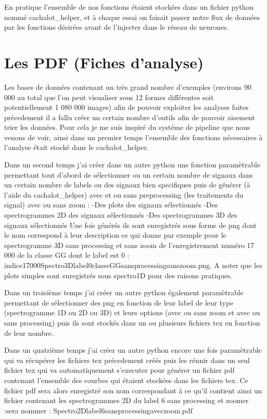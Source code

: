 En pratique l'ensemble de nos fonctions étaient stockées dans un fichier python nommé cachalot_helper, et à chaque essai on faisait passer notre flux de données par les fonctions désirées avant de l'injecter dans le réseau de neurones.


\hypertarget{Les-PDF}{%
\section{Les PDF (Fiches d'analyse)}
\label{Les-PDF}}

Les bases de données contenant un très grand nombre d'exemples (environs 90 000 au total que l'on peut visualiser sous 12 formes différentes soit potentiellement 1 080 000 images) afin de pouvoir exploiter les analyses faites précedement il a fallu créer un certain nombre d'outils afin de pouvoir aisement trier les données.
Pour cela je me suis inspiré du systéme de pipeline que nous venons de voir, ainsi dans un premier temps l'ensemble des fonctions nécessaires à l'analyse était stocké dans le cachalot_helper.

Dans un second temps j'ai créer dans un autre python une fonction paramètrable permettant tout d'abord de sélectionner ou un certain nombre de signaux dans un certain nombre de labels ou des signaux bien specifiques puis de générer (à l'aide du cachalot_helper) avec et ou sans preprocessing (les traitements du signal) avec ou sans zoom :
-Des plots des signaux sélectionnés
-Des spectrogrammes 2D des signaux sélectionnés
-Des spectrogrammes 3D des signaux sélectionnés
Une fois générés ils sont enregistrés sous forme de png dont le nom correspond à leur description ce qui donne par exemple pour le spectrogramme 3D sans processing et sans zoom de l'enregistrement numéro 17 000 de la classe GG dont le label est 0 :
indice17000Spectro3Dlabel0classeGGsansprocessingsanszoom.png. A noter que les plots simples sont enregistrés sous spectro1D pour des raisons pratiques.

Dans un troisième temps j'ai créer un autre python également paramètrable permettant de sélectionner des png en fonction de leur label de leur type (spectrogramme 1D ou 2D ou 3D) et leurs options (avec ou sans zoom et avec ou sans processing) puis ils sont stockés dans un ou plusieurs fichiers tex en fonction de leur nombre.

Dans un quatrième temps j'ai créer un autre python encore une fois paramètrable qui va récupérer les fichiers tex précedement créés puis les réunir dans un seul fichier tex qui va automatiquement s'executer pour générer un fichier pdf contenant l'ensemble des courbes qui étaient stockées dans les fichiers tex. Ce fichier pdf sera alors enregistré son nom correspondant à ce qu'il contient ainsi un fichier contenant les spectrogrammes 2D du label 6 sans processing et zoomer :sera nommer : Spectro2Dlabel6sansprocessingaveczoom.pdf

